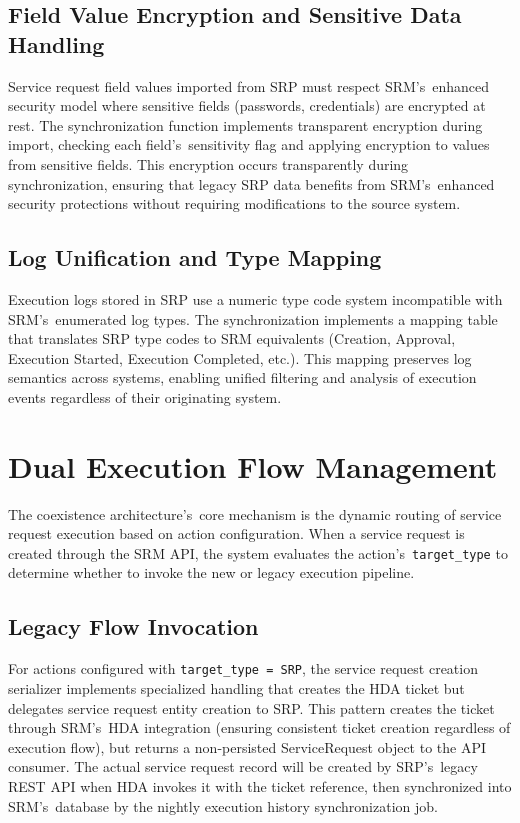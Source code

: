 \subsection{Field Value Encryption and Sensitive Data Handling}

Service request field values imported from SRP must respect SRM's~enhanced security model where sensitive fields (passwords, credentials) are encrypted at rest. The synchronization function implements transparent encryption during import, checking each field's~sensitivity flag and applying encryption to values from sensitive fields. This encryption occurs transparently during synchronization, ensuring that legacy SRP data benefits from SRM's~enhanced security protections without requiring modifications to the source system.

\subsection{Log Unification and Type Mapping}

Execution logs stored in SRP use a numeric type code system incompatible with SRM's~enumerated log types. The synchronization implements a mapping table that translates SRP type codes to SRM equivalents (Creation, Approval, Execution Started, Execution Completed, etc.). This mapping preserves log semantics across systems, enabling unified filtering and analysis of execution events regardless of their originating system.

\section{Dual Execution Flow Management}

The coexistence architecture's~core mechanism is the dynamic routing of service request execution based on action configuration. When a service request is created through the SRM API, the system evaluates the action's~\texttt{target\_type} to determine whether to invoke the new or legacy execution pipeline.

\subsection{Legacy Flow Invocation}

For actions configured with \texttt{target\_type = SRP}, the service request creation serializer implements specialized handling that creates the HDA ticket but delegates service request entity creation to SRP. This pattern creates the ticket through SRM's~HDA integration (ensuring consistent ticket creation regardless of execution flow), but returns a non-persisted ServiceRequest object to the API consumer. The actual service request record will be created by SRP's~legacy REST API when HDA invokes it with the ticket reference, then synchronized into SRM's~database by the nightly execution history synchronization job.


